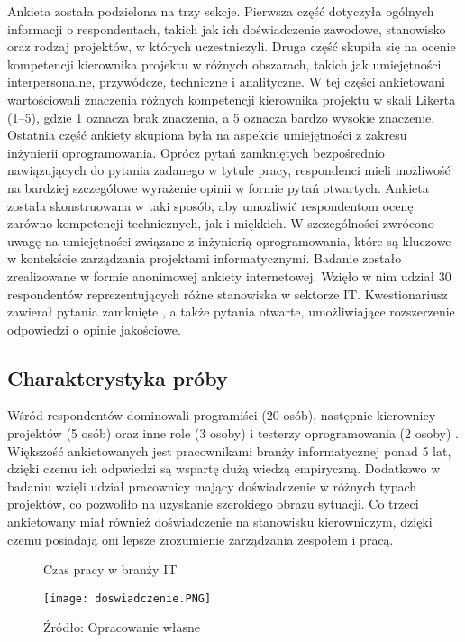 Ankieta została podzielona na trzy sekcje. Pierwsza część dotyczyła ogólnych informacji o respondentach, takich jak ich doświadczenie zawodowe, stanowisko oraz rodzaj projektów, w których uczestniczyli. Druga część skupiła się na ocenie kompetencji kierownika projektu w różnych obszarach, takich jak umiejętności interpersonalne, przywódcze, techniczne i analityczne. W tej części ankietowani wartościowali znaczenia różnych kompetencji kierownika projektu w skali Likerta (1–5), gdzie 1 oznacza brak znaczenia, a 5 oznacza bardzo wysokie znaczenie. Ostatnia część ankiety skupiona była na aspekcie umiejętności z zakresu inżynierii oprogramowania. Oprócz pytań zamkniętych bezpośrednio nawiązujących do pytania zadanego w tytule pracy, respondenci mieli możliwość na bardziej szczegółowe wyrażenie opinii w formie pytań otwartych.
Ankieta została skonstruowana w taki sposób, aby umożliwić respondentom ocenę zarówno kompetencji technicznych, jak i miękkich. W szczególności zwrócono uwagę na umiejętności związane z inżynierią oprogramowania, które są kluczowe w kontekście zarządzania projektami informatycznymi.
Badanie zostało zrealizowane w formie anonimowej ankiety internetowej. Wzięło w nim udział 30 respondentów reprezentujących różne stanowiska w sektorze IT. Kwestionariusz zawierał pytania zamknięte , a także pytania otwarte, umożliwiające rozszerzenie odpowiedzi o opinie jakościowe.

\subsection{Charakterystyka próby}

Wśród respondentów dominowali programiści (20 osób), następnie kierownicy projektów (5 osób) oraz inne role (3 osoby) i testerzy oprogramowania (2 osoby) . Większość ankietowanych jest pracownikami branży informatycznej ponad 5 lat, dzięki czemu ich odpwiedzi są wspartę dużą wiedzą empiryczną. Dodatkowo w badaniu wzięli udział pracownicy mający doświadczenie w różnych typach projektów, co pozwoliło na uzyskanie szerokiego obrazu sytuacji. Co trzeci ankietowany miał również doświadczenie na stanowisku kierowniczym, dzięki czemu posiadają oni lepsze zrozumienie zarządzania zespołem i pracą.

\begin{figure}
  \caption{Czas pracy w branży IT}
  \centering
  \texttt{[image: doswiadczenie.PNG]}
  \caption*{Źródło: Opracowanie własne}
\end{figure}

